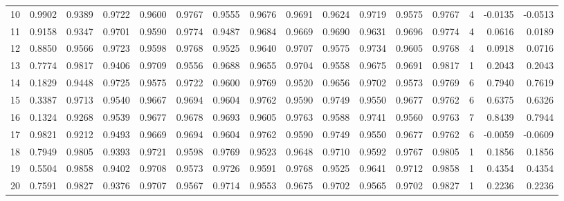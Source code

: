 \begin{tabular}{lrrrrrrrrrrrrrrr}
10  &      0.9902 &  0.9389 &  0.9722 &  0.9600 &  0.9767 &  0.9555 &  0.9676 &  0.9691 &  0.9624 &  0.9719 &   0.9575 &     0.9767 &      4 &                   -0.0135 &                    -0.0513 \\
11  &      0.9158 &  0.9347 &  0.9701 &  0.9590 &  0.9774 &  0.9487 &  0.9684 &  0.9669 &  0.9690 &  0.9631 &   0.9696 &     0.9774 &      4 &                    0.0616 &                     0.0189 \\
12  &      0.8850 &  0.9566 &  0.9723 &  0.9598 &  0.9768 &  0.9525 &  0.9640 &  0.9707 &  0.9575 &  0.9734 &   0.9605 &     0.9768 &      4 &                    0.0918 &                     0.0716 \\
13  &      0.7774 &  0.9817 &  0.9406 &  0.9709 &  0.9556 &  0.9688 &  0.9655 &  0.9704 &  0.9558 &  0.9675 &   0.9691 &     0.9817 &      1 &                    0.2043 &                     0.2043 \\
14  &      0.1829 &  0.9448 &  0.9725 &  0.9575 &  0.9722 &  0.9600 &  0.9769 &  0.9520 &  0.9656 &  0.9702 &   0.9573 &     0.9769 &      6 &                    0.7940 &                     0.7619 \\
15  &      0.3387 &  0.9713 &  0.9540 &  0.9667 &  0.9694 &  0.9604 &  0.9762 &  0.9590 &  0.9749 &  0.9550 &   0.9677 &     0.9762 &      6 &                    0.6375 &                     0.6326 \\
16  &      0.1324 &  0.9268 &  0.9539 &  0.9677 &  0.9678 &  0.9693 &  0.9605 &  0.9763 &  0.9588 &  0.9741 &   0.9560 &     0.9763 &      7 &                    0.8439 &                     0.7944 \\
17  &      0.9821 &  0.9212 &  0.9493 &  0.9669 &  0.9694 &  0.9604 &  0.9762 &  0.9590 &  0.9749 &  0.9550 &   0.9677 &     0.9762 &      6 &                   -0.0059 &                    -0.0609 \\
18  &      0.7949 &  0.9805 &  0.9393 &  0.9721 &  0.9598 &  0.9769 &  0.9523 &  0.9648 &  0.9710 &  0.9592 &   0.9767 &     0.9805 &      1 &                    0.1856 &                     0.1856 \\
19  &      0.5504 &  0.9858 &  0.9402 &  0.9708 &  0.9573 &  0.9726 &  0.9591 &  0.9768 &  0.9525 &  0.9641 &   0.9712 &     0.9858 &      1 &                    0.4354 &                     0.4354 \\
20  &      0.7591 &  0.9827 &  0.9376 &  0.9707 &  0.9567 &  0.9714 &  0.9553 &  0.9675 &  0.9702 &  0.9565 &   0.9702 &     0.9827 &      1 &                    0.2236 &                     0.2236 \\

\end{tabular}
